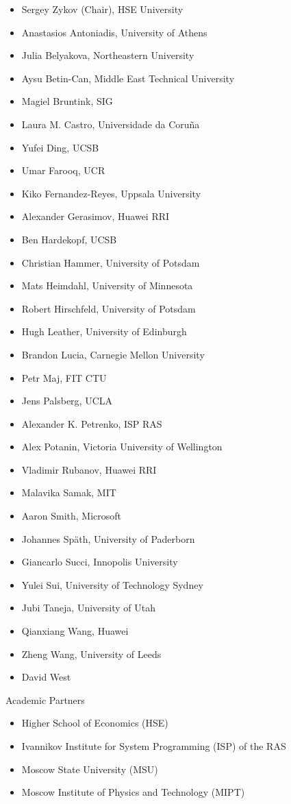\documentclass[12pt,twosides]{book}
\begin{document}
\begin{multicols}{2}
\begin{itemize}
\item Sergey Zykov (Chair), HSE University
\item Anastasios Antoniadis, University of Athens
\item Julia Belyakova, Northeastern University
\item Aysu Betin-Can, Middle East Technical University
\item Magiel Bruntink, SIG
\item Laura M. Castro, Universidade da Coruña
\item Yufei Ding, UCSB
\item Umar Farooq, UCR
\item Kiko Fernandez-Reyes, Uppsala University
\item Alexander Gerasimov, Huawei RRI
\item Ben Hardekopf, UCSB
\item Christian Hammer, University of Potsdam
\item Mats Heimdahl, University of Minnesota
\item Robert Hirschfeld, University of Potsdam
\item Hugh Leather, University of Edinburgh
\item Brandon Lucia, Carnegie Mellon University
\item Petr Maj, FIT CTU
\item Jens Palsberg, UCLA
\item Alexander K. Petrenko, ISP RAS
\item Alex Potanin, Victoria University of Wellington
\item Vladimir Rubanov, Huawei RRI
\item Malavika Samak, MIT
\item Aaron Smith, Microsoft
\item Johannes Späth, University of Paderborn
\item Giancarlo Succi, Innopolis University
\item Yulei Sui, University of Technology Sydney
\item Jubi Taneja, University of Utah
\item Qianxiang Wang, Huawei
\item Zheng Wang, University of Leeds
\item David West
\end{itemize}

Academic Partners

\begin{itemize}
\item Higher School of Economics (HSE)
\item Ivannikov Institute for System Programming (ISP) of the RAS
\item Moscow State University (MSU)
\item Moscow Institute of Physics and Technology (MIPT)
\end{itemize}


\end{multicols}
\end{document}
